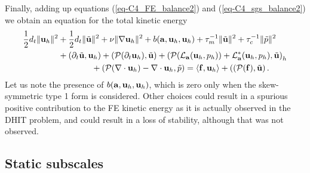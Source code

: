 Finally, adding up equations (\ref{eq-C4_FE_balance2}) and (\ref{eq-C4_sgs_balance2}) 
we obtain an equation for the total kinetic energy
\begin{align}
\label{eq-C4_total_balance}
   \frac{1}{2}d_t\|{\bf u}_h\|^2
& +\frac{1}{2}d_t\|\tilde{{\bf u}}\|^2
  +\nu\|\nabla{\bf u}_h\|^2+b({\bf a},{\bf u}_h,{\bf u}_h)
  +\tau_m^{-1}\|\tilde{{\bf u}}\|^2+\tau_c^{-1}\|\tilde{p}\|^2 \\ \nonumber
& +(\partial_t\tilde{{\bf u}},{\bf u}_h)
  +\left(\mathcal{P}(\partial_t{\bf u}_h),\tilde{{\bf u}}\right)
  +\left(\mathcal{P}(\mathcal{L}_{{\bf a}}({\bf u}_h,p_h))+\mathcal{L}^*_{{\bf a}}({\bf u}_h,p_h),\tilde{{\bf u}}\right)_h\\ \nonumber
& \quad \quad \quad \quad  +\left(\mathcal{P}(\nabla\cdot{\bf u}_h)-\nabla\cdot{\bf u}_h,\tilde{p}\right)=\left<\mathbf{f},\mathbf{u}_h\right>+\left((\mathcal{P}({\bf f}),\tilde{{\bf u}}\right).
\end{align}
Let us note the presence of $b({\bf a},{\bf u}_h,{\bf u}_h)$, which is zero only when the skew-symmetric type 1 form is considered. Other choices could result in a spurious positive contribution to the FE kinetic energy as it is actually observed in the DHIT problem, and could result in a loss of stability, although that was not observed.

\subsection{Static subscales} 

